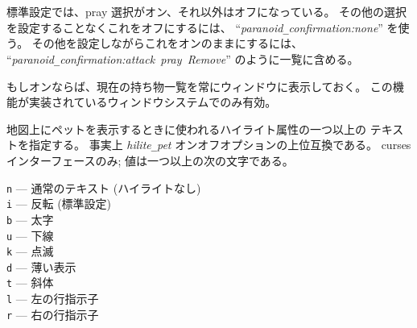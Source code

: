 標準設定では、pray 選択がオン、それ以外はオフになっている。
その他の選択を設定することなくこれをオフにするには、
``{\it paranoid\verb+_+confirmation:none}'' を使う。
その他を設定しながらこれをオンのままにするには、
``{\it par\-a\-noid\verb+_+con\-fir\-ma\-tion:attack~pray~Remove}'' のように一覧に含める。
\item[\ib{perm\verb+_+invent}]
もしオンならば、現在の持ち物一覧を常にウィンドウに表示しておく。
この機能が実装されているウィンドウシステムでのみ有効。
\item[\ib{petattr}]
地図上にペットを表示するときに使われるハイライト属性の一つ以上の
テキストを指定する。
事実上 {\it hilite\verb+_+pet\/} オンオフオプションの上位互換である。
curses インターフェースのみ; 値は一つ以上の次の文字である。

{\tt n} --- 通常のテキスト (ハイライトなし)\\
{\tt i} --- 反転 (標準設定)\\
{\tt b} --- 太字\\
{\tt u} --- 下線\\
{\tt k} --- 点滅\\
{\tt d} --- 薄い表示\\
{\tt t} --- 斜体\\
{\tt l} --- 左の行指示子\\
{\tt r} --- 右の行指示子\\

